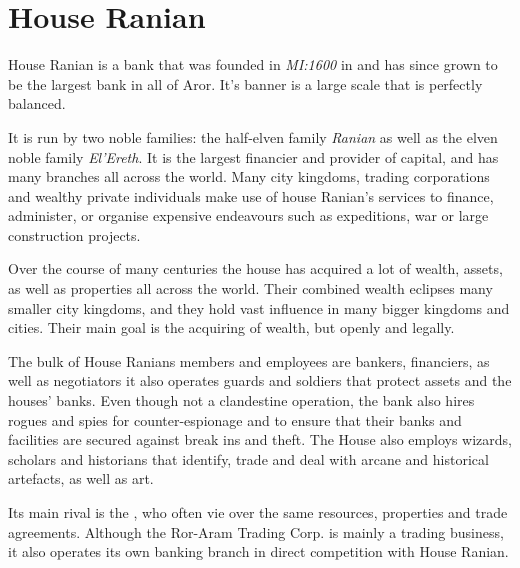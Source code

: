 \section{House Ranian}
\label{sec:House Ranian}

House Ranian is a bank that was founded in \emph{MI:1600} in
 and has since grown to be the largest bank in all of
Aror. It's banner is a large scale that is perfectly balanced.

It is run by two noble families: the half-elven family \emph{Ranian} as well
as the elven noble family \emph{El'Ereth}. It is the largest financier and
provider of capital, and has many branches all across the world. Many city
kingdoms, trading corporations and wealthy private individuals make use of
house Ranian's services to finance, administer, or organise expensive
endeavours such as expeditions, war or large construction projects.

Over the course of many centuries the house has acquired a lot of wealth,
assets, as well as properties all across the world. Their combined wealth
eclipses many smaller city kingdoms, and they hold vast influence in many
bigger kingdoms and cities. Their main goal is the acquiring of wealth,
but openly and legally.

The bulk of House Ranians members and employees are bankers, financiers,
as well as negotiators it also operates guards and soldiers that protect
assets and the houses' banks. Even though not a clandestine operation,
the bank also hires rogues and spies for counter-espionage and to ensure
that their banks and facilities are secured against break ins and theft.
The House also employs wizards, scholars and historians that identify,
trade and deal with arcane and historical artefacts, as well as art.

Its main rival is the , who often
vie over the same resources, properties and trade agreements. Although the
Ror-Aram Trading Corp. is mainly a trading business, it also operates its
own banking branch in direct competition with House Ranian.

